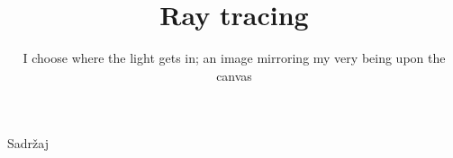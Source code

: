 \documentclass[9pt]{beamer}
\title{Ray tracing}
\subtitle{I choose where the light gets in;	an image mirroring my very being upon the canvas}
\institute{Računalna grafika}
\begin{document}
\begin{frame}
 \titlepage
\end{frame}

\begin{frame}{Sadržaj}
  \tableofcontents
\end{frame}

%
%
\end{document}
